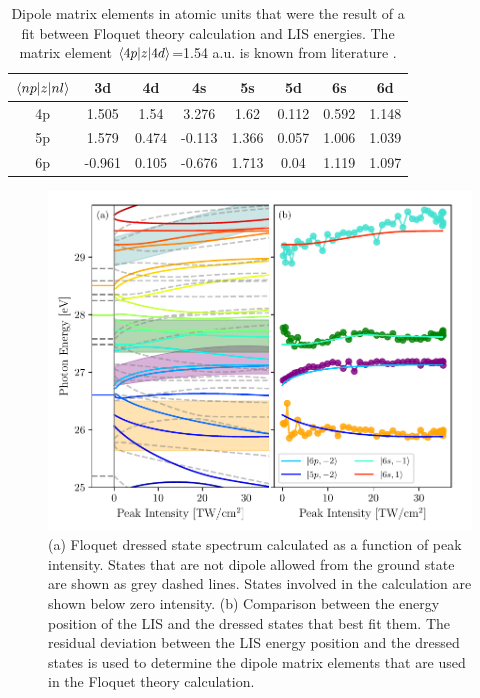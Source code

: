 \begin{table}[]
	\centering
	\begin{tabular}{c|ccccccc}
		\toprule
		$\braket{np|z|nl}$ & 3d     & 4d    & 4s     & 5s    & 5d    & 6s    & 6d    \\ \hline
		4p                 & 1.505  & 1.54  & 3.276  & 1.62  & 0.112 & 0.592 & 1.148 \\
		5p                 & 1.579  & 0.474 & -0.113 & 1.366 & 0.057 & 1.006 & 1.039 \\
		6p                 & -0.961 & 0.105 & -0.676 & 1.713 & 0.04  & 1.119 & 1.097 \\
		\bottomrule
	\end{tabular}
	\caption[Dipole matrix elements used in Floquet calculation]{Dipole matrix elements in atomic units that were the result of a fit between Floquet theory calculation and LIS energies. The matrix element $\braket{4p|z|4d}$=1.54 a.u. is known from literature \cite{wangFewCycleFemtosecondPulse2005}.}
	\label{tab:matrix_elements}
\end{table}

\begin{figure}
	\centering
	\includegraphics[width=1.0\textwidth]{figures/ATS/full_Floquet.pdf}
	\caption[Floquet dressed states for all 10 states]{(a) Floquet dressed state spectrum calculated as a function of peak intensity. States that are not dipole allowed from the ground state are shown as grey dashed lines.  States involved in the calculation are shown below zero intensity. (b) Comparison between the energy position of the LIS and the dressed states that best fit them. The residual deviation between the LIS energy position and the dressed states is used to determine the dipole matrix elements that are used in the Floquet theory calculation.}
	\label{fig:full_floquet}
\end{figure}




